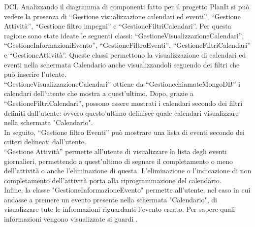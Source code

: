 \begin{listaPersonale}{DCL}
    Analizzando il diagramma di componenti fatto per il progetto PlanIt si può vedere la presenza di “Gestione visualizzazione calendari ed eventi”, “Gestione Attività”, “Gestione filtro impegni” e “GestioneFiltriCalendari”. Per questa ragione sono state ideate le seguenti classi: “GestioneVisualizzazioneCalendari”,  “GestioneInformazioniEvento”, “GestioneFiltroEventi”, “GestioneFiltriCalendari” e “GestioneAttività”. Queste classi permettono la visualizzazione di calendari ed eventi nella schermata Calendario  anche visualizzandoli seguendo dei filtri che può inserire l'utente.\\
    “GestioneVisualizzazioneCalendari” ottiene da “GestionechiamateMongoDB” i calendari dell'utente che mostra a quest'ultimo. Dopo, grazie a “GestioneFiltriCalendari”, possono essere mostrati i calendari secondo dei filtri definiti dall'utente: ovvero questo'ultimo definisce quale calendari visualizzare nella schermata "Calendario".\\
    In seguito, “Gestione filtro Eventi” può mostrare una lista di eventi secondo dei criteri delineati dall'utente.\\
    “Gestione Attività”  permette all'utente di visualizzare la lista degli eventi giornalieri, permettendo a quest'ultimo di segnare il completamento o meno dell'attività o anche l'eliminazione di questa. L'eliminazione o l'indicazione di non completamento dell'attività porta alla riprogrammazione del calendario.\\
    Infine, la classe "GestioneInformazioneEvento" permette all'utente, nel caso in cui andasse a premere un evento presente nella schermata "Calendario", di visualizzare tute le informazioni riguardanti l'evento creato. Per sapere quali informazioni vengono visualizzate si guardi .


    \begin{center}
        
    \end{center}
    \newpage



\end{listaPersonale}
